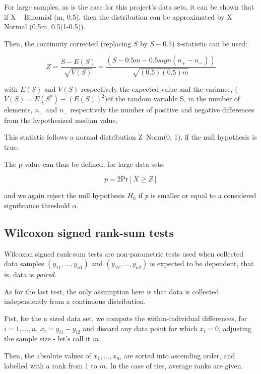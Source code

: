 For large samples, as is the case for this project's data sets, it can be shown that if X ~ Binomial (m, 0.5), then the distribution can be approximated by X ~ Normal (0.5m, 0.5(1-0.5)).

Then, the continuity corrected (replacing $S$ by $S-0.5$) z-statistic can be used:

\begin{equation}
Z=\dfrac{S-E(S)}{\sqrt{V(S)}}= \dfrac{(S-0.5m - 0.5 sign(n_+-n_-))}{\sqrt{(0.5)(0.5)m}}
\end{equation}

with $E(S)$ and $V(S)$ respectively the expected value and the variance, ($V(S)=E(S^2)-(E(S))^2$)of the random variable S, m the number of elements, $n_{+}$ and $n_{-}$ respectively the number of positive and negative differences from the hypothesized median value.

This statistic follows a normal distribution Z~Norm(0, 1), if the null hypothesis is true. 

The p-value can thus be defined, for large data sets:

\begin{equation}
p = 2 \text{Pr}\left[X \geq Z\right]
\end{equation}

and we again reject the null hypothesis $H_0$ if \textit{p} is smaller or equal to a considered significance threshold $\alpha$.

\subsection{Wilcoxon signed rank-sum tests}
\label{subsec:subbsectionC}

Wilcoxon signed rank-sum tests are non-parametric tests used when collected data samples $(y_{11},...,y_{n1})$ and $(y_{12},...,y_{n2})$ is expected to be dependent, that is, data is \textit{paired}.

As for the last test, the only assumption here is that data is collected independently from a continuous distribution.

Fist, for the n sized data set, we compute the within-individual differences, for $i=1,...,n$, $x_i = y_{i1} - y_{i2}$ and discard any data point for which $x_i=0$, adjusting the sample size - let's call it $m$.

Then, the absolute values of $x_1,...,x_m$ are sorted into ascending order, and labelled with a rank from 1 to $m$. In the case of ties, average ranks are given.

